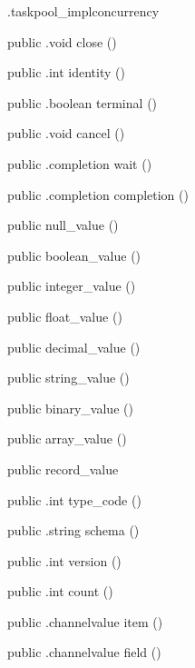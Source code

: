 \begin{CrexxClass}{.taskpool\_impl}{concurrency}
\begin{Members}
    \Method
      {public}
      {.void}
      {close}
      {()}

    \Method
      {public}
      {.int}
      {identity}
      {()}

    \Method
      {public}
      {.boolean}
      {terminal}
      {()}

    \Method
      {public}
      {.void}
      {cancel}
      {()}

    \Method
      {public}
      {.completion}
      {wait}
      {()}

    \Method
      {public}
      {.completion}
      {completion}
      {()}

    \Factory
      {public}
      {null\_value}
      {()}

    \Factory
      {public}
      {boolean\_value}
      {()}

    \Factory
      {public}
      {integer\_value}
      {()}

    \Factory
      {public}
      {float\_value}
      {()}

    \Factory
      {public}
      {decimal\_value}
      {()}

    \Factory
      {public}
      {string\_value}
      {()}

    \Factory
      {public}
      {binary\_value}
      {()}

    \Factory
      {public}
      {array\_value}
      {()}

    \Factory
      {public}
      {record\_value}
      {}

    \Method
      {public}
      {.int}
      {type\_code}
      {()}

    \Method
      {public}
      {.string}
      {schema}
      {()}

    \Method
      {public}
      {.int}
      {version}
      {()}

    \Method
      {public}
      {.int}
      {count}
      {()}

    \Method
      {public}
      {.channelvalue}
      {item}
      {()}

    \Method
      {public}
      {.channelvalue}
      {field}
      {()}


\end{Members}
\end{CrexxClass}
